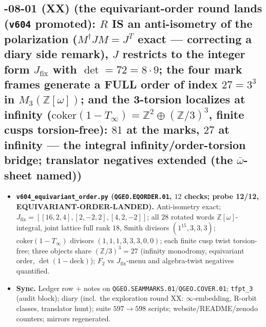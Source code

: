 \subsection*{-08-01 (XX) (the equivariant-order round lands (\texttt{v604} promoted): $R$ IS an anti-isometry of the polarization ($M^\dagger JM=J^T$ exact --- correcting a diary side remark), $J$ restricts to the integer form $J_{\mathrm{fix}}$ with $\det=72=8\cdot9$; the four mark frames generate a FULL order of index $27=3^3$ in $M_3(\mathbb{Z}[\omega])$; and the 3-torsion localizes at infinity ($\mathrm{coker}(1-T_\infty)=\mathbb{Z}^2\oplus(\mathbb{Z}/3)^3$, finite cusps torsion-free): $81$ at the marks, $27$ at infinity --- the integral infinity/order-torsion bridge; translator negatives extended (the $\bar\omega$-sheet named))}
\begin{itemize}[leftmargin=1.5em]
\item \textbf{\texttt{v604\_equivariant\_order.py} (\texttt{QGEO.EQORDER.01}, $12$ checks; probe
12/12, EQUIVARIANT-ORDER-LANDED).} Anti-isometry exact; $J_{\mathrm{fix}}=[[16,2,4],[2,-2,2],[4,2,-2]]$;
all $28$ rotated words $\mathbb{Z}[\omega]$-integral, joint lattice full rank $18$, Smith
divisors $(1^{15},3,3,3)$; $\mathrm{coker}(1-T_\infty)$ divisors $(1,1,1,3,3,3,0,0)$; each
finite cusp twist torsion-free; three objects share $(\mathbb{Z}/3)^3=27$ (infinity
monodromy, equivariant order, $\det(1-\mathrm{deck})$); $F_2$ vs $J_{\mathrm{fix}}$-menu and
algebra-twist negatives quantified.
\item \textbf{Sync.} Ledger row + notes on
\texttt{QGEO.SEAMMARKS.01}/\texttt{QGEO.COVER.01}; \texttt{tfpt\_3} (audit block); diary
(incl.\ the exploration round XX: $\infty$-embedding, R-orbit classes, translator hunt);
suite $597\to598$ scripts; website/README/zenodo counters; mirrors regenerated.
\end{itemize}

